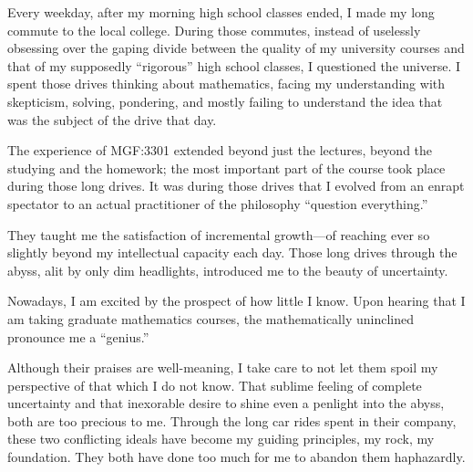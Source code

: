 \documentclass[12pt]{article}
\begin{document}
Every weekday, after my morning high school classes ended, I made my long commute to the local college. During those commutes, instead of uselessly obsessing over the gaping divide between the quality of my university courses and that of my supposedly ``rigorous'' high school classes, I questioned the universe. I spent those drives thinking about mathematics, facing my understanding with skepticism, solving, pondering, and mostly failing to understand the idea that was the subject of the drive that day.

The experience of MGF:3301 extended beyond just the lectures, beyond the studying and the homework; the most important part of the course took place during those long drives. It was during those drives that I evolved from an enrapt spectator to an actual practitioner of the philosophy ``question everything.''


They taught me the satisfaction of incremental growth---of reaching ever so slightly beyond my intellectual capacity each day. Those long drives through the abyss, alit by only dim headlights, introduced me to the beauty of uncertainty.



Nowadays, I am excited by the prospect of how little I know. Upon hearing that I am taking graduate mathematics courses, the mathematically uninclined pronounce me a ``genius.''

Although their praises are well-meaning, I take care to not let them spoil my perspective of that which I do not know. That sublime feeling of complete uncertainty and that inexorable desire to shine even a penlight into the abyss, both are too precious to me. Through the long car rides spent in their company, these two conflicting ideals have become my guiding principles, my rock, my foundation. They both have done too much for me to abandon them haphazardly.


\end{document}
